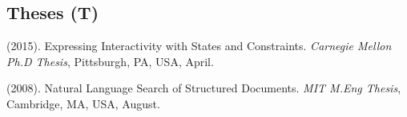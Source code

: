 \subsection{Theses (T)}

 {
     (2015). Expressing Interactivity with States and Constraints. \textit{Carnegie Mellon Ph.D Thesis}, Pittsburgh, PA, USA, April.
}

 {
     (2008). Natural Language Search of Structured Documents. \textit{MIT M.Eng Thesis}, Cambridge, MA, USA, August.
}
